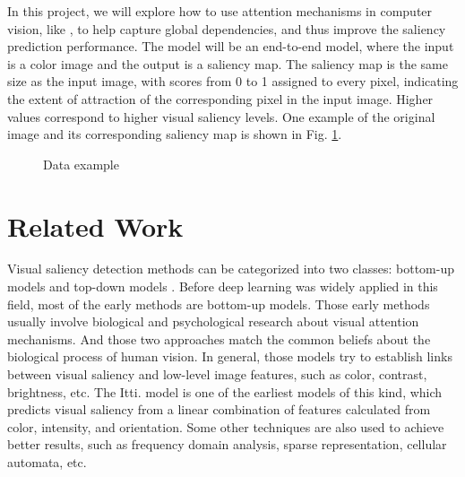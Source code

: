 \documentclass[12pt]{article}
\begin{document}
In this project, we will explore how to use attention mechanisms in computer vision, like \cite{zhangSelfAttentionGenerativeAdversarial2019a},
to help capture global dependencies, and thus improve the saliency prediction performance. 
The model will be an end-to-end model, where the input is a color image and the output is a saliency map.
The saliency map is the same size as the input image, with scores from 0 to 1 assigned to 
every pixel, indicating the extent of attraction of the corresponding pixel in the input image.
Higher values correspond to higher visual saliency levels.
One example of the original image and its corresponding saliency map is shown in Fig. \ref{img:data_example}.
\begin{figure}[!h]
    \centering
    \hspace{5mm}
    \caption{Data example}
    \label{img:data_example}
\end{figure}


\section{Related Work}

Visual saliency detection methods can be categorized into two classes: bottom-up models and top-down models \cite{congReviewVisualSaliency2019}.
Before deep learning was widely applied in this field, most of the early methods are bottom-up models.
Those early methods usually involve biological and psychological research about visual attention mechanisms. And those two approaches match the common beliefs about the biological process of human vision.
In general, those models try to establish links between visual saliency and low-level image features, such as color, contrast, brightness, etc. The Itti. model\cite{ittiModelSaliencybasedVisual1998}
is one of the earliest models of this kind, which predicts visual saliency from a linear combination of features calculated from color, intensity, and orientation.
Some other techniques are also used to achieve better results, such as frequency domain analysis, sparse representation, cellular automata, etc. \cite{congReviewVisualSaliency2019}
\end{document}
